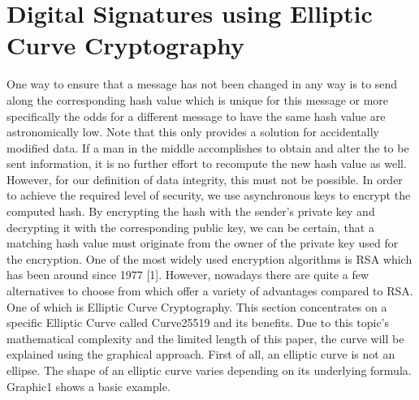 \section{Digital Signatures using Elliptic Curve Cryptography}

One way to ensure that a message has not been changed in any way is to send along the corresponding hash value which is unique for this message or more specifically the odds for a different message to have the same hash value are astronomically low. Note that this only provides a solution for accidentally modified data. If a man in the middle accomplishes to obtain and alter the to be sent information, it is no further effort to recompute the new hash value as well. However, for our definition of data integrity, this must not be possible. In order to achieve the required level of security, we use asynchronous keys to encrypt the computed hash. By encrypting the hash with the sender’s private key and decrypting it with the corresponding public key, we can be certain, that a matching hash value must originate from the owner of the private key used for the encryption. 
One of the most widely used encryption algorithms is RSA which has been around since 1977 [1]. However, nowadays there are quite a few alternatives to choose from which offer a variety of advantages compared to RSA. One of which is Elliptic Curve Cryptography. This section concentrates on a specific Elliptic Curve called Curve25519 and its benefits.
Due to this topic’s mathematical complexity and the limited length of this paper, the curve will be explained using the graphical approach.
First of all, an elliptic curve is not an ellipse. The shape of an elliptic curve varies depending on its underlying formula. Graphic1 shows a basic example. 


